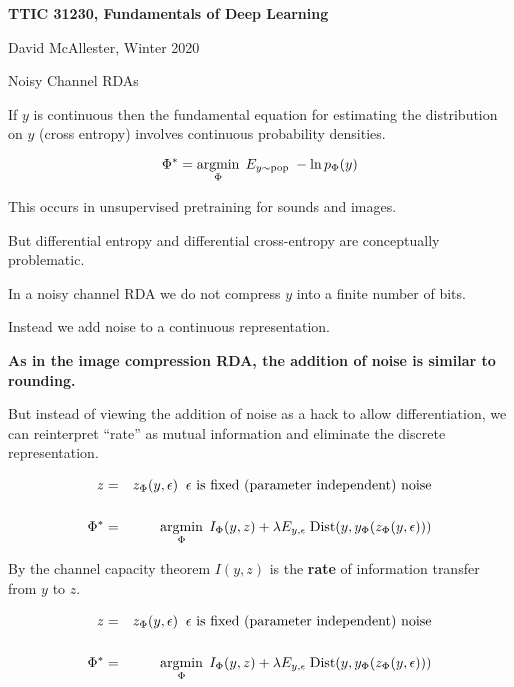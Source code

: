 





{\Huge

  \centerline{\bf TTIC 31230, Fundamentals of Deep Learning}
  \bigskip
  \centerline{David McAllester, Winter 2020}
  \vfill
  \centerline{Noisy Channel RDAs}
  \vfill
  \vfill


If $y$ is continuous then the fundamental equation for estimating the distribution on $y$ (cross entropy) involves continuous probability densities.

\vfill
$$\Phi^* = \operatorname*{argmin}_\Phi \;E_{y \sim \mathrm{pop}}\;-\ln p_\Phi(y)$$

\vfill
This occurs in unsupervised pretraining for sounds and images.

\vfill
But differential entropy and differential cross-entropy are conceptually problematic.


In a noisy channel RDA we do not compress $y$ into a finite number of bits.

\vfill
Instead we add noise to a continuous representation.

\vfill
{\bf As in the image compression RDA, the addition of noise is similar to rounding.}

\vfill
But instead of viewing the addition of noise as a hack to allow differentiation, we can reinterpret ``rate'' as mutual information
and eliminate the discrete representation.


\bigskip
\bigskip
\begin{eqnarray*}
z & = & z_\Phi(y,\epsilon) \;\;\mbox{$\epsilon$ is fixed (parameter independent) noise} \\
\\
\Phi^* & = & \operatorname*{argmin}_\Phi \;I_\Phi(y,z) + \lambda E_{y,\epsilon}\; \mathrm{Dist}(y,y_\Phi(z_\Phi(y,\epsilon)))
\end{eqnarray*}

\bigskip
By the channel capacity theorem {\color{red} $I(y,z)$} is the {\bf rate} of information transfer from $y$ to $z$.


\bigskip
\bigskip
\begin{eqnarray*}
z & = & z_\Phi(y,\epsilon) \;\;\mbox{$\epsilon$ is fixed (parameter independent) noise} \\
\\
\Phi^* & = & \operatorname*{argmin}_\Phi \;I_\Phi(y,z) + \lambda E_{y,\epsilon}\; \mathrm{Dist}(y,y_\Phi(z_\Phi(y,\epsilon)))
\end{eqnarray*}
        
}
